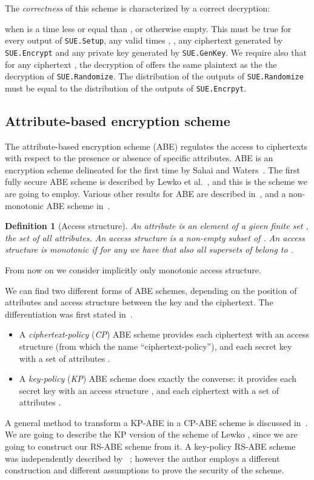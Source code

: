 \documentclass[a4paper,10pt]{article}
\newtheorem{definition}{Definition}
\newcommand{\singlefunction}[1]{\texttt{#1}}
\begin{document}
	\noindent The \emph{correctness} of this scheme is characterized by a correct decryption:
	
	when  is a time less or equal than , or otherwise empty.
	This must be true for every output of \singlefunction{SUE.Setup}, any valid times , , any ciphertext  generated by \singlefunction{SUE.Encrypt} and any private key  generated by \singlefunction{SUE.GenKey}.
	We require also that for any ciphertext , the decryption of  offers the same plaintext as the 
the decryption of \singlefunction{SUE.Randomize}.
	The distribution of the outputs of \singlefunction{SUE.Randomize} must be equal to the distribution of the outputs of \singlefunction{SUE.Encrpyt}.
	
	\subsection{Attribute-based encryption scheme}
	The attribute-based encryption scheme (ABE) regulates the access to ciphertexts with respect to the presence or absence of specific attributes.
	ABE is an encryption scheme delineated for the first time by Sahai and Waters~\cite{sahai2005}. The first fully secure ABE scheme is described by Lewko et al.~\cite{lewko2010ABE}, and this is the scheme we are going to employ. Various other results for ABE are described in~\cite{chase2007, garg2013, waters2011}, and a non-monotonic ABE scheme in~\cite{ostrovsky2007}.
	\begin{definition}[Access structure]
	\label{def.accessstructure}
	An \emph{attribute} is an element of a given finite set , the set of all attributes. An \emph{access structure} is a non-empty subset of . 
	An access structure  is \emph{monotonic}  if for any   we have that also
	all supersets of  belong to . 
	\end{definition}
	\noindent From now on we consider implicitly only monotonic access structure.
	
	We can find two different forms of ABE schemes, depending on the position of attributes and access structure between the key and the ciphertext. The differentiation was first stated in~\cite{goyal2006}.
	\begin{itemize}
		\item
		A \emph{ciphertext-policy} (\emph{CP}) ABE scheme provides  each ciphertext with an access structure  (from which the name ``ciphertext-policy''), and  each secret key with a set of attributes .
		\item
		A \emph{key-policy} (\emph{KP}) ABE scheme does exactly the converse: it provides  each secret key with an access structure , and  each ciphertext with a set of attributes .
	\end{itemize}
	A general method to transform a KP-ABE in a CP-ABE scheme is discussed in~\cite{goyal2008}.	
	We are going to describe the KP version of the scheme of Lewko \cite{lewko2010ABE}, since we are going to construct our RS-ABE scheme from it. A key-policy RS-ABE scheme was independently described by \citeauthor{lee2014}~\cite{lee2014}; however the author employs a different construction and different assumptions to prove the security of the scheme.
\end{document}
